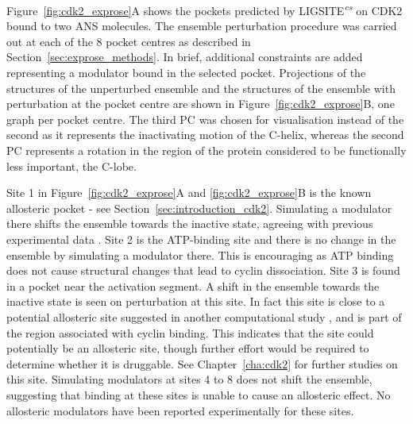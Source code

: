 Figure~\ref{fig:cdk2_exprose}A shows the pockets predicted by LIGSITE\textsuperscript{\it cs} \cite{Huang2006} on CDK2 bound to two ANS molecules.
The ensemble perturbation procedure was carried out at each of the 8 pocket centres as described in Section~\ref{sec:exprose_methods}.
In brief, additional constraints are added representing a modulator bound in the selected pocket.
Projections of the structures of the unperturbed ensemble and the structures of the ensemble with perturbation at the pocket centre are shown in Figure~\ref{fig:cdk2_exprose}B, one graph per pocket centre.
The third PC was chosen for visualisation instead of the second as it represents the inactivating motion of the \textalpha C-helix, whereas the second PC represents a rotation in the region of the protein considered to be functionally less important, the C-lobe.

Site 1 in Figure~\ref{fig:cdk2_exprose}A and \ref{fig:cdk2_exprose}B is the known allosteric pocket - see Section~\ref{sec:introduction_cdk2}.
Simulating a modulator there shifts the ensemble towards the inactive state, agreeing with previous experimental data \cite{Betzi2011}.
Site 2 is the ATP-binding site and there is no change in the ensemble by simulating a modulator there.
This is encouraging as ATP binding does not cause structural changes that lead to cyclin dissociation.
Site 3 is found in a pocket near the activation segment.
A shift in the ensemble towards the inactive state is seen on perturbation at this site.
In fact this site is close to a potential allosteric site suggested in another computational study \cite{Pitt2014}, and is part of the region associated with cyclin binding.
This indicates that the site could potentially be an allosteric site, though further effort would be required to determine whether it is druggable.
See Chapter~\ref{cha:cdk2} for further studies on this site.
Simulating modulators at sites 4 to 8 does not shift the ensemble, suggesting that binding at these sites is unable to cause an allosteric effect.
No allosteric modulators have been reported experimentally for these sites.


